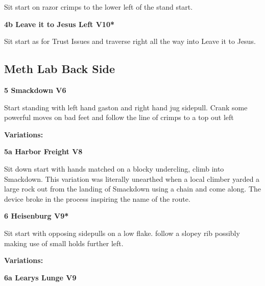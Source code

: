 \begin{multicols}{2}
\begin{adjustwidth}{0.5cm}{}
					\begin{adjustwidth}{0.5cm}{}				
					Sit start on razor crimps to the lower left of the stand start.
					\end{adjustwidth}
					\label{vr:Leave it to Jesus Left}
\colorbox{red!20}{
\parbox{0.95\linewidth}{
\textbf{
4b Leave it to Jesus Left V10*  
}
}
}

					\begin{adjustwidth}{0.5cm}{}				
					Sit start as for Trust Issues and traverse right all the way into Leave it to Jesus.
					\end{adjustwidth}
				\end{adjustwidth}

		\subsection*{Meth Lab Back Side}\label{bf:Meth Lab Back Side}
			
			\label{rt:Smackdown}
\colorbox{RoyalBlue!20}{
\parbox{0.95\linewidth}{
\textbf{
5 Smackdown V6  
}
}
}

			\begin{adjustwidth}{0.5cm}{}				
			Start standing with left hand gaston and right hand jug sidepull. Crank some powerful moves on bad feet and follow the line of crimps to a top out left
			\end{adjustwidth}
				\begin{adjustwidth}{0.5cm}{}				
				\textbf{Variations:} \newline
					\label{vr:Harbor Freight}
\colorbox{Goldenrod!50}{
\parbox{0.95\linewidth}{
\textbf{
5a Harbor Freight V8  
}
}
}

					\begin{adjustwidth}{0.5cm}{}				
					Sit down start with hands matched on a blocky undercling, climb into Smackdown. This variation was literally unearthed when a local climber yarded a large rock out from the landing of Smackdown using a chain and come along. The device broke in the process inspiring the name of the route.
					\end{adjustwidth}
				\end{adjustwidth}
			\label{rt:Heisenburg}
\colorbox{Goldenrod!50}{
\parbox{0.95\linewidth}{
\textbf{
6 Heisenburg V9*  
}
}
}

			\begin{adjustwidth}{0.5cm}{}				
			Sit start with opposing sidepulls on a low flake. follow a slopey rib possibly making use of small holds further left.
			\end{adjustwidth}
				\begin{adjustwidth}{0.5cm}{}				
				\textbf{Variations:} \newline
					\label{vr:Learys Lunge}
\colorbox{Goldenrod!50}{
\parbox{0.95\linewidth}{
\textbf{
6a Learys Lunge V9  
}
}
}


\end{adjustwidth}
\end{multicols}
